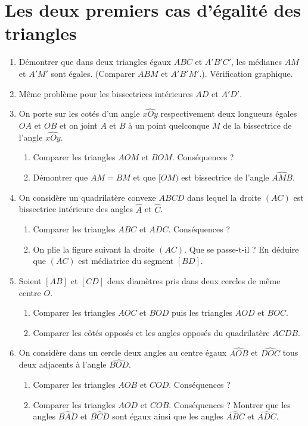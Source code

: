 \documentclass[12 pt]{report}
\theoremstyle{plain}
\newcounter{n}
\begin{document}
\chapter{Les deux premiers cas d'égalité des triangles} 
\begin{enumerate}
\item Démontrer que dans deux triangles égaux $ABC$ et $A'B'C'$, les médianes $AM$ et $A'M'$ sont égales. (Comparer $ABM$ et $A'B'M'$.). Vérification graphique. 
\item Même problème pour les bissectrices intérieures $AD$ et $A'D'$.
\item On porte sur les cotés d'un angle $\widehat{xOy}$ respectivement deux longueurs égales $OA$ et $OB$ et on joint $A$ et $B$ à un point quelconque $M$ de la bissectrice de l'angle $\widehat{xOy}$.\begin{enumerate}
\item Comparer les triangles $AOM$ et $BOM$. Conséquences ? 
\item Démontrer que $AM=BM$ et que $[OM)$ est bissectrice de l'angle $\widehat{AMB}$.
\end{enumerate}
\item On considère un quadrilatère convexe $ABCD$ dans lequel la droite $(AC)$ est bissectrice intérieure des angles $\widehat{A}$ et $\widehat{C}$. 
\begin{enumerate}
\item Comparer les triangles $ABC$ et $ADC$. Conséquences ? 
\item On plie la figure suivant la droite $(AC)$. Que se passe-t-il ? En déduire que $(AC)$ est médiatrice du segment $[BD]$. 
\end{enumerate}
\item Soient $[AB]$ et $[CD]$ deux diamètres pris dans deux cercles de même centre $O$.\begin{enumerate}
\item Comparer les triangles $AOC$ et $BOD$ puis les triangles $AOD$ et $BOC$. 
\item Comparer les côtés opposés et les angles opposés du quadrilatère $ACDB$.
\end{enumerate}
\item On considère dans un cercle deux angles au centre égaux $\widehat{AOB}$ et
$\widehat{DOC}$ tous deux adjacents à l'angle $\widehat{BOD}$. 
\begin{enumerate}
\item Comparer les triangles $AOB$ et $COD$. Conséquences ? 
\item Comparer les triangles $AOD$ et $COB$. Conséquences ? Montrer que les angles $\widehat{BAD}$ et $\widehat{BCD}$ sont égaux ainsi que les angles $\widehat{ABC}$ et $\widehat{ADC}$. 

\end{enumerate}
\end{enumerate}
\end{document}
